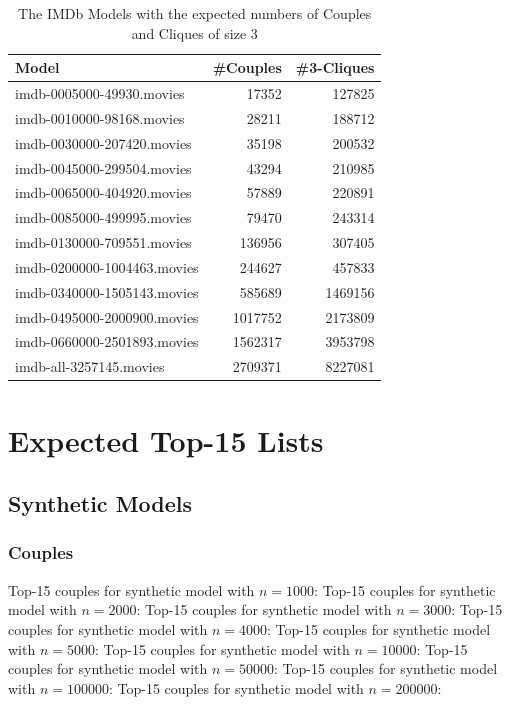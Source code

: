 \documentclass[a4paper,11pt]{article}
\newcommand{\qr}[3]{\noindent{}Top-15 #2 for #3:{\scriptsize}}
\begin{document}
\begin{table}[!ht]
  \centering
  \begin{tabular}{| l | r | r |}
    \hline
    \textbf{Model}              & \textbf{\#Couples} & \textbf{\#3-Cliques}\\
    \hline
    imdb-0005000-49930.movies   & 17352              & 127825\\
    imdb-0010000-98168.movies   & 28211              & 188712\\
    imdb-0030000-207420.movies  & 35198              & 200532\\
    imdb-0045000-299504.movies  & 43294              & 210985\\
    imdb-0065000-404920.movies  & 57889              & 220891\\
    imdb-0085000-499995.movies  & 79470              & 243314\\
    imdb-0130000-709551.movies  & 136956             & 307405\\
    imdb-0200000-1004463.movies & 244627             & 457833\\
    imdb-0340000-1505143.movies & 585689             & 1469156\\
    imdb-0495000-2000900.movies & 1017752            & 2173809\\
    imdb-0660000-2501893.movies & 1562317            & 3953798\\
    imdb-all-3257145.movies     & 2709371            & 8227081\\
    \hline
  \end{tabular}
  \caption{The IMDb Models with the expected numbers of Couples and Cliques of size 3}
  \label{tab:imdb-numbers}
\end{table}

\newpage
\section{Expected Top-15 Lists}
\label{sec:top-15}

\subsection{Synthetic Models}
\label{sec:top-15:synthetic-models}

\subsubsection{Couples}

\qr{synth-1000.query.couples}{couples}{synthetic model with \(n=1000\)}
\qr{synth-2000.query.couples}{couples}{synthetic model with \(n=2000\)}
\qr{synth-3000.query.couples}{couples}{synthetic model with \(n=3000\)}
\qr{synth-4000.query.couples}{couples}{synthetic model with \(n=4000\)}
\qr{synth-5000.query.couples}{couples}{synthetic model with \(n=5000\)}
\qr{synth-10000.query.couples}{couples}{synthetic model with \(n=10000\)}
\qr{synth-50000.query.couples}{couples}{synthetic model with \(n=50000\)}
\qr{synth-100000.query.couples}{couples}{synthetic model with \(n=100000\)}
\qr{synth-200000.query.couples}{couples}{synthetic model with \(n=200000\)}
\end{document}
